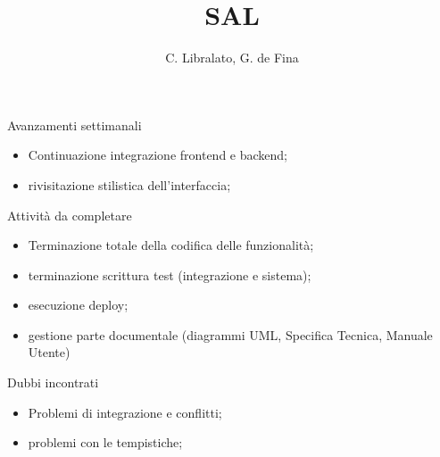 \documentclass{beamer}
\title{SAL}
\author[C. Libralato, G. de Fina]{C. Libralato, G. de Fina}
\begin{document}
{
\begin{frame}
    \titlepage
\end{frame}
}

\makeMembersFrame

\begin{frame}{Avanzamenti settimanali}
    \begin{itemize}
        \setlength{\itemsep}{0.9em}
        \item Continuazione integrazione frontend e backend;
        \item rivisitazione stilistica dell'interfaccia;
    \end{itemize}
\end{frame}


\makePrecedentTodoFrame


\makePrecedentTodoFrame


\begin{frame}{Attività da completare}
    \begin{itemize}
        \setlength{\itemsep}{0.9em}
        \item Terminazione totale della codifica delle funzionalità;
        \item terminazione scrittura test (integrazione e sistema);
        \item esecuzione deploy;
        \item gestione parte documentale (diagrammi UML, Specifica Tecnica, Manuale Utente)
    \end{itemize}
\end{frame}

\begin{frame}{Dubbi incontrati}
    \begin{itemize}
        \setlength{\itemsep}{0.9em}
        \item Problemi di integrazione e conflitti;
        \item problemi con le tempistiche;
    \end{itemize}
\end{frame}
\end{document}

